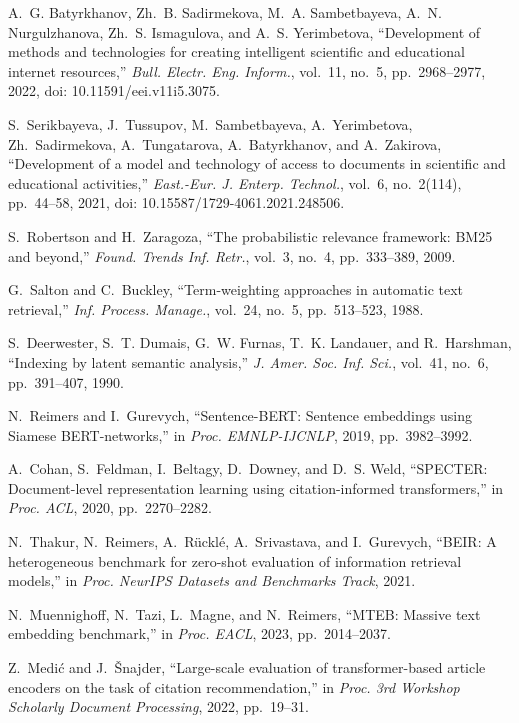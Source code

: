 A.~G. Batyrkhanov, Zh.~B. Sadirmekova, M.~A. Sambetbayeva, A.~N. Nurgulzhanova, Zh.~S. Ismagulova, and A.~S. Yerimbetova, ``Development of methods and technologies for creating intelligent scientific and educational internet resources,'' \emph{Bull. Electr. Eng. Inform.}, vol.~11, no.~5, pp.~2968--2977, 2022, doi: 10.11591/eei.v11i5.3075.

S.~Serikbayeva, J.~Tussupov, M.~Sambetbayeva, A.~Yerimbetova, Zh.~Sadirmekova, A.~Tungatarova, A.~Batyrkhanov, and A.~Zakirova, ``Development of a model and technology of access to documents in scientific and educational activities,'' \emph{East.-Eur. J. Enterp. Technol.}, vol.~6, no.~2(114), pp.~44--58, 2021, doi: 10.15587/1729-4061.2021.248506.

S.~Robertson and H.~Zaragoza, ``The probabilistic relevance framework: BM25 and beyond,'' \emph{Found. Trends Inf. Retr.}, vol.~3, no.~4, pp.~333--389, 2009.

G.~Salton and C.~Buckley, ``Term-weighting approaches in automatic text retrieval,'' \emph{Inf. Process. Manage.}, vol.~24, no.~5, pp.~513--523, 1988.

S.~Deerwester, S.~T. Dumais, G.~W. Furnas, T.~K. Landauer, and R.~Harshman, ``Indexing by latent semantic analysis,'' \emph{J. Amer. Soc. Inf. Sci.}, vol.~41, no.~6, pp.~391--407, 1990.

N.~Reimers and I.~Gurevych, ``Sentence-BERT: Sentence embeddings using Siamese BERT-networks,'' in \emph{Proc. EMNLP-IJCNLP}, 2019, pp.~3982--3992.

A.~Cohan, S.~Feldman, I.~Beltagy, D.~Downey, and D.~S. Weld, ``SPECTER: Document-level representation learning using citation-informed transformers,'' in \emph{Proc. ACL}, 2020, pp.~2270--2282.

N.~Thakur, N.~Reimers, A.~R{\"u}ckl{\'e}, A.~Srivastava, and I.~Gurevych, ``BEIR: A heterogeneous benchmark for zero-shot evaluation of information retrieval models,'' in \emph{Proc. NeurIPS Datasets and Benchmarks Track}, 2021.

N.~Muennighoff, N.~Tazi, L.~Magne, and N.~Reimers, ``MTEB: Massive text embedding benchmark,'' in \emph{Proc. EACL}, 2023, pp.~2014--2037.

Z.~Medi{\'c} and J.~{\v{S}}najder, ``Large-scale evaluation of transformer-based article encoders on the task of citation recommendation,'' in \emph{Proc. 3rd Workshop Scholarly Document Processing}, 2022, pp.~19--31.

